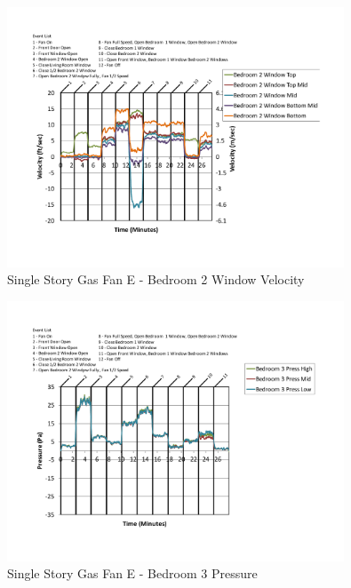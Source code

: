 \documentclass{article}
\begin{document}
\begin{appendices}
	\begin{figure}[H]
		\centering
		\includegraphics[height=3.05in,trim=0.67in 1.1in 0.67in 0.8in,clip=true]{0_Images/Results_Charts/ColdFlow/Single_Story/Gas/E/Bedroom_2_Window_Velocity.pdf}
		\caption{Single Story Gas Fan E - Bedroom 2 Window Velocity}
	\end{figure}
 

	\begin{figure}[H]
		\centering
		\includegraphics[height=3.05in,trim=0.67in 1.1in 0.67in 0.8in,clip=true]{0_Images/Results_Charts/ColdFlow/Single_Story/Gas/E/Bedroom_3_Pressure.pdf}
		\caption{Single Story Gas Fan E - Bedroom 3 Pressure}
	\end{figure}
 
	\clearpage


\end{appendices}
\end{document}
